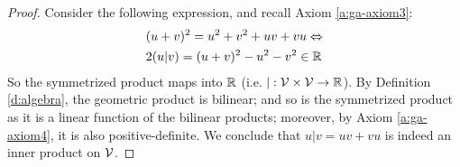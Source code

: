 \begin{proof}
	Consider the following expression, and recall Axiom \ref{a:ga-axiom3}:
    \begin{align*}
        &(u+v)^2 = u^2 + v^2 + uv + vu \Leftrightarrow \\
        &2(u|v) = (u+v)^2 - u^2 - v^2 \in \mathbb{R}
    \end{align*}
	So the symmetrized product maps into $\mathbb{R}$ (i.e. $| : \mathcal{V} \times \mathcal{V} \to \mathbb{R}$). By Definition \ref{d:algebra}, the geometric product is bilinear; and so is the symmetrized product as it is a linear function of the bilinear products; moreover, by Axiom \ref{a:ga-axiom4}, it is also positive-definite. We conclude that $u|v = uv + vu$ is indeed an inner product on $\mathcal{V}$.
	
\end{proof}
